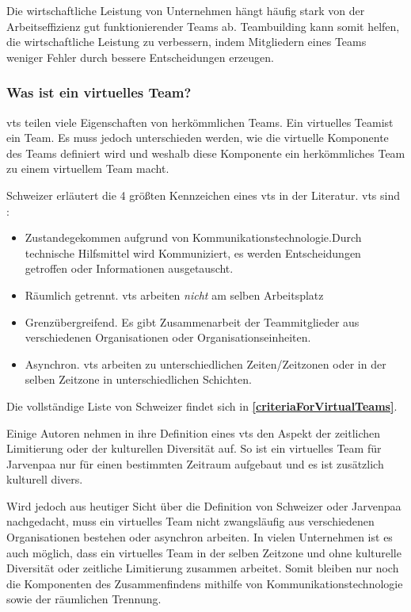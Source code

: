 \documentclass[a4paper,11pt]{article}%
\renewcommand{\\}{\vspace*{0.5\baselineskip} \newline}
\begin{document}
Die wirtschaftliche Leistung von Unternehmen hängt häufig stark von der Arbeitseffizienz gut funktionierender Teams ab. Teambuilding kann somit helfen, die wirtschaftliche Leistung zu verbessern, indem Mitgliedern eines Teams weniger Fehler durch bessere Entscheidungen erzeugen. \citep[p. 1-6]{biech2007pfeiffer} 

\subsubsection{Was ist ein virtuelles Team?}


\ac{vts} teilen viele Eigenschaften von herkömmlichen Teams. Ein \dq virtuelles Team\dq ist ein \dq Team\dq. Es muss jedoch unterschieden werden, wie die virtuelle Komponente des Teams definiert wird und weshalb diese Komponente ein herkömmliches Team zu einem virtuellem Team macht. 

Schweizer \citep[p.270]{schweitzer2010conceptualizing} erläutert die 4 größten Kennzeichen eines \ac{vts} in der Literatur.
\ac{vts} sind :
\begin{itemize}
\item Zustandegekommen aufgrund von Kommunikationstechnologie.Durch technische Hilfsmittel wird Kommuniziert, es werden Entscheidungen getroffen oder Informationen ausgetauscht.
\item Räumlich getrennt. \ac{vts} arbeiten \textit{nicht} am selben Arbeitsplatz
\item Grenzübergreifend. Es gibt Zusammenarbeit der Teammitglieder aus verschiedenen Organisationen oder Organisationseinheiten.
\item Asynchron. \ac{vts} arbeiten zu unterschiedlichen Zeiten/Zeitzonen oder in der selben Zeitzone in unterschiedlichen Schichten.
\end{itemize}

Die vollständige Liste von Schweizer findet sich in \textbf{\autoref{criteriaForVirtualTeams}}.

Einige Autoren nehmen in ihre Definition eines \ac{vts} den Aspekt der zeitlichen Limitierung oder der kulturellen Diversität auf. So ist ein virtuelles Team für Jarvenpaa \citep[p.1-2]{jarvenpaa1999communication} nur für einen bestimmten Zeitraum aufgebaut und es ist zusätzlich kulturell divers. 

Wird jedoch aus heutiger Sicht über die Definition von Schweizer oder Jarvenpaa nachgedacht, muss ein virtuelles Team nicht zwangsläufig aus verschiedenen Organisationen bestehen oder asynchron arbeiten. In vielen Unternehmen ist es auch möglich, dass ein virtuelles Team in der selben Zeitzone und ohne kulturelle Diversität oder zeitliche Limitierung zusammen arbeitet.
Somit bleiben nur noch die Komponenten des Zusammenfindens mithilfe von Kommunikationstechnologie sowie der räumlichen Trennung.
\end{document}
